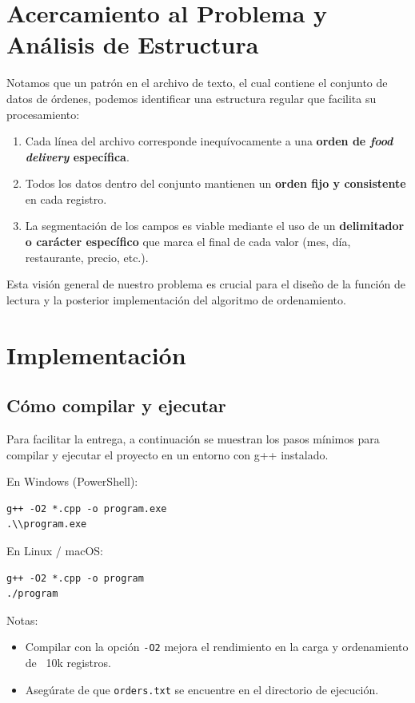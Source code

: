 \documentclass{article}
\begin{document}
\section{Acercamiento al Problema y Análisis de Estructura}
Notamos que un patrón en el archivo de texto, el cual contiene el conjunto de datos de órdenes, podemos identificar una estructura regular que facilita su procesamiento:

\begin{enumerate}
    \item Cada línea del archivo corresponde inequívocamente a una \textbf{orden de \textit{food delivery} específica}.
    \item Todos los datos dentro del conjunto mantienen un \textbf{orden fijo y consistente} en cada registro.
    \item La segmentación de los campos es viable mediante el uso de un \textbf{delimitador o carácter específico} que marca el final de cada valor (mes, día, restaurante, precio, etc.).
\end{enumerate}

Esta visión general de nuestro problema es crucial para el diseño de la función de lectura y la posterior implementación del algoritmo de ordenamiento.

\section{Implementación}
\subsection{Cómo compilar y ejecutar}
Para facilitar la entrega, a continuación se muestran los pasos mínimos para compilar y ejecutar el proyecto en un entorno con g++ instalado.

En Windows (PowerShell):
\begin{verbatim}
g++ -O2 *.cpp -o program.exe
.\\program.exe
\end{verbatim}

En Linux / macOS:
\begin{verbatim}
g++ -O2 *.cpp -o program
./program
\end{verbatim}

Notas:
\begin{itemize}
  \item Compilar con la opción \texttt{-O2} mejora el rendimiento en la carga y ordenamiento de ~10k registros.
  \item Asegúrate de que \texttt{orders.txt} se encuentre en el directorio de ejecución.
\end{itemize}
\end{document}
